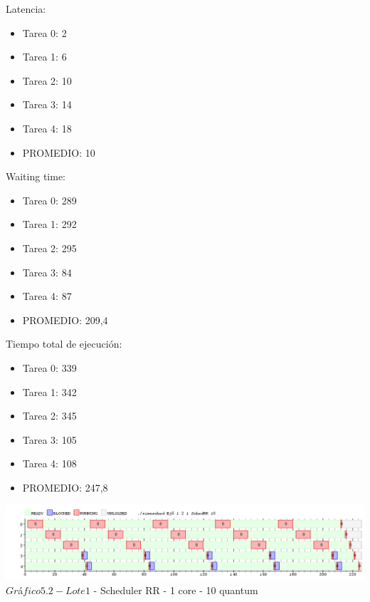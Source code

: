 \indent Latencia:\
\begin{itemize}
 \item Tarea 0: 2
 \item Tarea 1: 6
 \item Tarea 2: 10
 \item Tarea 3: 14
 \item Tarea 4: 18
 \item PROMEDIO: 10
\end{itemize}
\indent Waiting time:\
\begin{itemize}
 \item Tarea 0: 289
 \item Tarea 1: 292
 \item Tarea 2: 295
 \item Tarea 3: 84
 \item Tarea 4: 87
 \item PROMEDIO: 209,4
\end{itemize}
\indent Tiempo total de ejecuci\'{o}n:\
\begin{itemize}
 \item Tarea 0: 339
 \item Tarea 1: 342
 \item Tarea 2: 345
 \item Tarea 3: 105
 \item Tarea 4: 108
 \item PROMEDIO: 247,8
\end{itemize}

\begin{center}
  	\includegraphics[width=450pt]{./Test/ej5_10.png}
	  {$Gr$\'a$fico 5.2 - Lote 1$ - Scheduler RR - 1 core - 10 quantum}	
\end{center}

